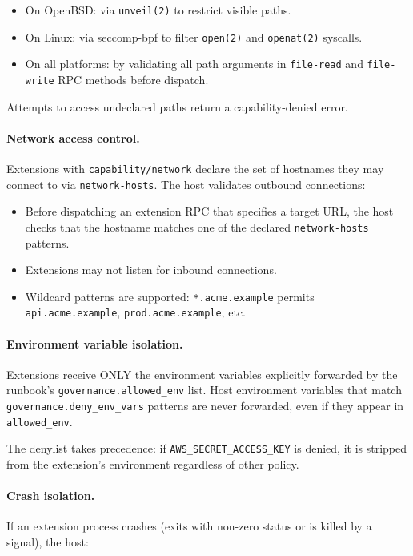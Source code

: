 \begin{itemize}
  \item On OpenBSD: via \texttt{unveil(2)} to restrict visible paths.
  \item On Linux: via seccomp-bpf to filter \texttt{open(2)} and
        \texttt{openat(2)} syscalls.
  \item On all platforms: by validating all path arguments in
        \texttt{file-read} and \texttt{file-write} RPC methods before dispatch.
\end{itemize}

Attempts to access undeclared paths return a capability-denied error.

\paragraph{Network access control.}
Extensions with \texttt{capability/network} declare the set of hostnames they
may connect to via \texttt{network-hosts}.  The host validates outbound
connections:

\begin{itemize}
  \item Before dispatching an extension RPC that specifies a target URL, the
        host checks that the hostname matches one of the declared
        \texttt{network-hosts} patterns.
  \item Extensions may not listen for inbound connections.
  \item Wildcard patterns are supported: \texttt{*.acme.example} permits
        \texttt{api.acme.example}, \texttt{prod.acme.example}, etc.
\end{itemize}

\paragraph{Environment variable isolation.}
Extensions receive ONLY the environment variables explicitly forwarded by the
runbook's \texttt{governance.allowed\_env} list.  Host environment variables
that match \texttt{governance.deny\_env\_vars} patterns are never forwarded,
even if they appear in \texttt{allowed\_env}.

The denylist takes precedence: if \texttt{AWS\_SECRET\_ACCESS\_KEY} is denied,
it is stripped from the extension's environment regardless of other policy.

\paragraph{Crash isolation.}
If an extension process crashes (exits with non-zero status or is killed by a
signal), the host:

